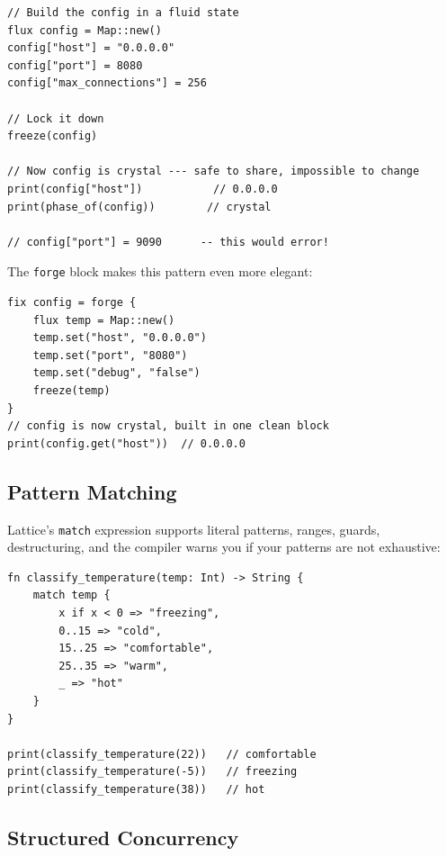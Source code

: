 \begin{lstlisting}[language=Lattice, caption={Building and freezing a configuration}]
// Build the config in a fluid state
flux config = Map::new()
config["host"] = "0.0.0.0"
config["port"] = 8080
config["max_connections"] = 256

// Lock it down
freeze(config)

// Now config is crystal --- safe to share, impossible to change
print(config["host"])           // 0.0.0.0
print(phase_of(config))        // crystal

// config["port"] = 9090      -- this would error!
\end{lstlisting}

The \lstinline|forge| block makes this pattern even more elegant:

\begin{lstlisting}[language=Lattice, caption={Forge: build fluid, end crystal}]
fix config = forge {
    flux temp = Map::new()
    temp.set("host", "0.0.0.0")
    temp.set("port", "8080")
    temp.set("debug", "false")
    freeze(temp)
}
// config is now crystal, built in one clean block
print(config.get("host"))  // 0.0.0.0
\end{lstlisting}

\subsection{Pattern Matching}\label{subsec:match-taste}

Lattice's \lstinline|match| expression supports literal patterns, ranges, guards, destructuring, and the compiler warns you if your patterns are not exhaustive:

\begin{lstlisting}[language=Lattice, caption={Pattern matching}]
fn classify_temperature(temp: Int) -> String {
    match temp {
        x if x < 0 => "freezing",
        0..15 => "cold",
        15..25 => "comfortable",
        25..35 => "warm",
        _ => "hot"
    }
}

print(classify_temperature(22))   // comfortable
print(classify_temperature(-5))   // freezing
print(classify_temperature(38))   // hot
\end{lstlisting}

\subsection{Structured Concurrency}\label{subsec:concurrency-taste}

